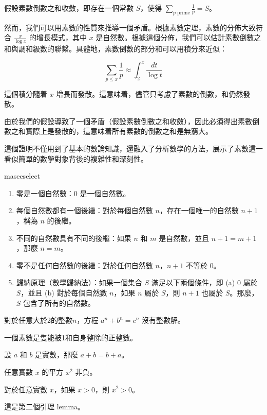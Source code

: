 \documentclass[
    writingLanguage=chinese, %
    addPageTitle=on,  %
    addDeclaration=on, %
    addMUSTlog=off, %
    addFigTOC=on, %
    addTabTOC=on, %
    refIndent=off, %
    printMod=off, %
]{.def/must}
\begin{document}
假設素數倒數之和收斂，即存在一個常數 \( S \)，使得 \( \sum_{p \text{ prime}} \frac{1}{p} = S \)。

然而，我們可以用素數的性質來推導一個矛盾。根據素數定理，素數的分佈大致符合 \( \frac{x}{\log x} \) 的增長模式，其中 \( x \) 是自然數。根據這個分佈，我們可以估計素數倒數之和與調和級數的聯繫。具體地，素數倒數的部分和可以用積分來近似：

\[
\sum_{p \leq x} \frac{1}{p} \approx \int_2^x \frac{dt}{\log t}
\]

這個積分隨着 \( x \) 增長而發散。這意味着，儘管只考慮了素數的倒數，和仍然發散。

由於我們的假設導致了一個矛盾（假設素數倒數之和收斂），因此必須得出素數倒數之和實際上是發散的，這意味着所有素數的倒數之和是無窮大。

這個證明不僅用到了基本的數論知識，還融入了分析數學的方法，展示了素數這一看似簡單的數學對象背後的複雜性和深刻性。
\begin{axiom}[皮亞諾公理 1]
maseeselect
\begin{enumerate}[label=\Alph*.]
\item 零是一個自然數：$0$ 是一個自然數。
\item 每個自然數都有一個後繼：對於每個自然數 $n$，存在一個唯一的自然數 $n+1$，稱為 $n$ 的後繼。
\item 不同的自然數具有不同的後繼：如果 $n$ 和 $m$ 是自然數，並且 $n+1 = m+1$，那麼 $n = m$。
\item 零不是任何自然數的後繼：對於任何自然數 $n$，$n+1$ 不等於 $0$。
\item 歸納原理（數學歸納法）：如果一個集合 $S$ 滿足以下兩個條件，即 (a) $0$ 屬於 $S$，並且 (b) 對於每個自然數 $n$，如果 $n$ 屬於 $S$，則 $n+1$ 也屬於 $S$。那麼，$S$ 包含了所有的自然數。
\end{enumerate}
\end{axiom}

\begin{theorem}[費馬定理]
對於任意大於2的整數$n$，方程 $a^n + b^n = c^n$ 沒有整數解。
\end{theorem}

\begin{definition}
    一個素數是隻能被1和自身整除的正整數。
\end{definition}
\begin{example}
    設 $a$ 和 $b$ 是實數，那麼 $a+b=b+a$。
\end{example}

\begin{property}
    任意實數 $x$ 的平方 $x^2$ 非負。
\end{property}
\begin{proposition}
    對於任意實數 $x$，如果 $x > 0$，則 $x^2 > 0$。
\end{proposition}
\begin{lemma}
這是第二個引理 lemma。
\end{lemma}
\end{document}
